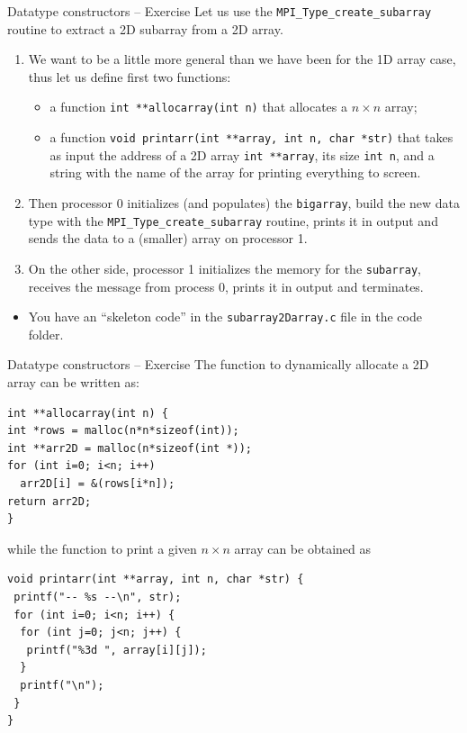 \documentclass[xcolor={svgnames,usenames}]{beamer}
\begin{document}
\begin{frame}[fragile]{Datatype constructors -- Exercise}
Let us use the \texttt{MPI_Type_create_subarray} routine to extract a 2D subarray from a 2D array.
\begin{enumerate}
	\item We want to be a little more general than we have been for the 1D array case, thus let us define first two functions:
	\begin{itemize}
		\item a function \texttt{int **allocarray(int n)} that allocates a $n\times n$ array;
		\item a function \texttt{void printarr(int **array, int n, char *str)} that takes as input the address of a 2D array \texttt{int **array}, its size \texttt{int n}, and a string with the name of the array for printing everything to screen.
	\end{itemize}
	\item Then processor 0 initializes (and populates) the \texttt{bigarray}, build the new data type with the \texttt{MPI_Type_create_subarray} routine, prints it in output and sends the data to a (smaller) array on processor 1.
	\item On the other side, processor 1 initializes the memory for the \texttt{subarray}, receives the message from process 0, prints it in output and terminates.
\end{enumerate}
\begin{itemize}
	\item You have an ``skeleton code'' in the \texttt{subarray2Darray.c} file in the code folder.
\end{itemize}
\end{frame}

\begin{frame}[fragile]{Datatype constructors -- Exercise}
\small
The function to dynamically allocate a 2D array can be written as:
\begin{verbatim}
int **allocarray(int n) {
int *rows = malloc(n*n*sizeof(int));
int **arr2D = malloc(n*sizeof(int *));
for (int i=0; i<n; i++)
  arr2D[i] = &(rows[i*n]);
return arr2D;
}
\end{verbatim}
while the function to print a given $n\times n$ array can be obtained as
\begin{verbatim}
void printarr(int **array, int n, char *str) {
 printf("-- %s --\n", str);
 for (int i=0; i<n; i++) {
  for (int j=0; j<n; j++) {
   printf("%3d ", array[i][j]);
  }
  printf("\n");
 }
}
\end{verbatim}
\end{frame}
\end{document}
